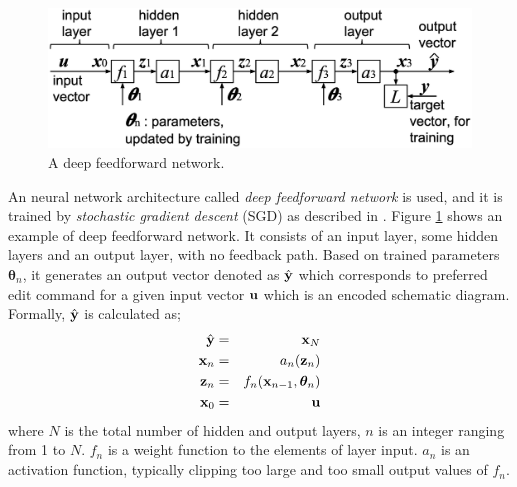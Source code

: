\documentclass[twocolumn]{article}
\begin{document}
\begin{figure}[!tb]
 \begin{center}
  \begin{minipage}{\hsize}
   \includegraphics[width=\hsize]{fig/deep_feedforward_03.eps}
   \caption{A deep feedforward network.}
   \label{fig:deep_feedforward}
  \end{minipage}
 \end{center}
\end{figure}

An neural network architecture called {\it deep feedforward network} is used,
and it is trained by {\it stochastic gradient descent} (SGD)
as described in \cite{mit}.
Figure \ref{fig:deep_feedforward} shows an example of deep feedforward network.
It consists of an input layer, some hidden layers and an output layer,
with no feedback path.
Based on trained parameters ${\bm \theta}_n$,
it generates an output vector denoted as $\hat{\bf y}$
which corresponds to preferred edit command for a given input vector
${\bf u}$ which is an encoded schematic diagram.
Formally, $\hat{\bf y}$ is calculated as;
\begin{eqnarray}
\hat{\bf y} &=& {\bf x}_N \\
{\bf x}_n &=& a_n({\bf z}_n) \\
{\bf z}_n &=& f_n({\bf x}_{n-1}, {\bm \theta}_n)\\
{\bf x}_0 &=& {\bf u}
\end{eqnarray}
where $N$ is the total number of hidden and output layers,
$n$ is an integer ranging from 1 to $N$.
$f_n$ is a weight function to the elements of layer input.
$a_n$ is an activation function,
typically clipping too large and too small output values of $f_n$.
\end{document}
